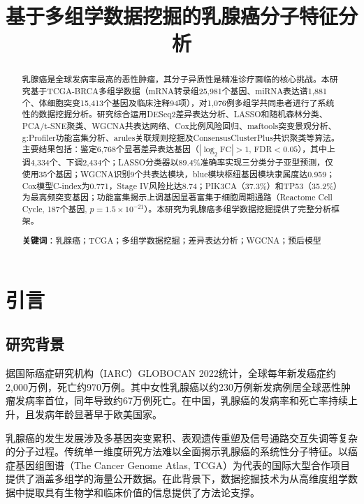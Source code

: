 \documentclass[12pt,a4paper]{ctexart}
\title{\heiti\zihao{3} 基于多组学数据挖掘的乳腺癌分子特征分析}
\author{}
\date{}
\begin{document}
\maketitle

\begin{abstract}
\noindent
乳腺癌是全球发病率最高的恶性肿瘤，其分子异质性是精准诊疗面临的核心挑战。本研究基于TCGA-BRCA多组学数据（mRNA转录组25,981个基因、miRNA表达谱1,881个、体细胞突变15,413个基因及临床注释94项），对1,076例多组学共同患者进行了系统性的数据挖掘分析。研究综合运用DESeq2差异表达分析、LASSO和随机森林分类、PCA/t-SNE聚类、WGCNA共表达网络、Cox比例风险回归、maftools突变景观分析、g:Profiler功能富集分析、arules关联规则挖掘及ConsensusClusterPlus共识聚类等算法。主要结果包括：鉴定6,768个显著差异表达基因（$|\log_2\text{FC}|>1$, FDR$<0.05$），其中上调4,334个、下调2,434个；LASSO分类器以89.4\%准确率实现三分类分子亚型预测，仅使用35个基因；WGCNA识别9个共表达模块，blue模块枢纽基因模块隶属度达0.959；Cox模型C-index为0.771，Stage IV风险比达8.74；PIK3CA（37.3\%）和TP53（35.2\%）为最高频突变基因；功能富集揭示上调基因显著富集于细胞周期通路（Reactome Cell Cycle, 187个基因, $p=1.5\times10^{-21}$）。本研究为乳腺癌多组学数据挖掘提供了完整分析框架。

\vspace{1em}
\noindent\textbf{关键词}：乳腺癌；TCGA；多组学数据挖掘；差异表达分析；WGCNA；预后模型
\end{abstract}

\newpage

\section{引言}

\subsection{研究背景}

据国际癌症研究机构（IARC）GLOBOCAN 2022统计，全球每年新发癌症约2,000万例，死亡约970万例\cite{sung2024global}。其中女性乳腺癌以约230万例新发病例居全球恶性肿瘤发病率首位，同年导致约67万例死亡。在中国，乳腺癌的发病率和死亡率持续上升，且发病年龄显著早于欧美国家。

乳腺癌的发生发展涉及多基因突变累积、表观遗传重塑及信号通路交互失调等复杂的分子过程\cite{hanahan2011hallmarks}。传统单一维度研究方法难以全面揭示乳腺癌的系统性分子特征。以癌症基因组图谱（The Cancer Genome Atlas, TCGA）\cite{tcga2012comprehensive}为代表的国际大型合作项目提供了涵盖多组学的海量公开数据。在此背景下，数据挖掘技术为从高维度组学数据中提取具有生物学和临床价值的信息提供了方法论支撑。
\end{document}
